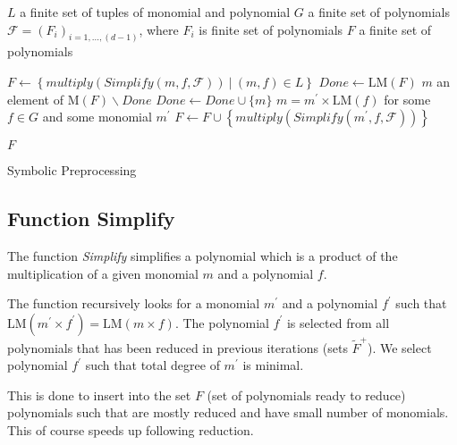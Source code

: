 \begin{algorithm}[ht]
  \begin{algorithmic}[1]
    \Require
      \Statex $L$ a finite set of tuples of monomial and polynomial
      \Statex $G$ a finite set of polynomials
      \Statex $\mathcal{F} = (F_i)_{i=1,\ldots,(d-1)}$, where $F_i$ is finite set of polynomials
    \Ensure
      \Statex $F$ a finite set of polynomials
      \Statex

    \State $F \gets \left\{multiply(Simplify(m, f, \mathcal{F}))\ |\ (m, f)\in L\right\}$
    \State $Done \gets \textrm{LM}(F)$
      \State $m$ an element of $\textrm{M}(F)\backslash Done$
      \State $Done \gets Done \cup \{m\}$
        \State $m = m^\prime \times \textrm{LM}(f)$ for some $f \in G$ and some monomial $m^\prime$
        \State $F \gets F \cup \left\{multiply(Simplify(m^\prime, f, \mathcal{F}))\right\}$
      \EndIf
    \EndWhile

    \State \Return $F$

  \end{algorithmic}
  \caption{Symbolic Preprocessing}
\end{algorithm}

\subsection{Function Simplify}
The function \textit{Simplify} simplifies a polynomial which is a product of the multiplication of a given monomial $m$ and a polynomial $f$.

The function recursively looks for a monomial $m^\prime$ and a polynomial $f^\prime$ such that $\textrm{LM}(m^\prime\times f^\prime) = \textrm{LM}(m\times f)$. The polynomial $f^\prime$ is selected from all polynomials that has been reduced in previous iterations (sets $\tilde{F}^+$). We select polynomial $f^\prime$ such that total degree of $m^\prime$ is minimal.

This is done to insert into the set $F$ (set of polynomials ready to reduce) polynomials such that are mostly reduced and have small number of monomials. This of course speeds up following reduction.

